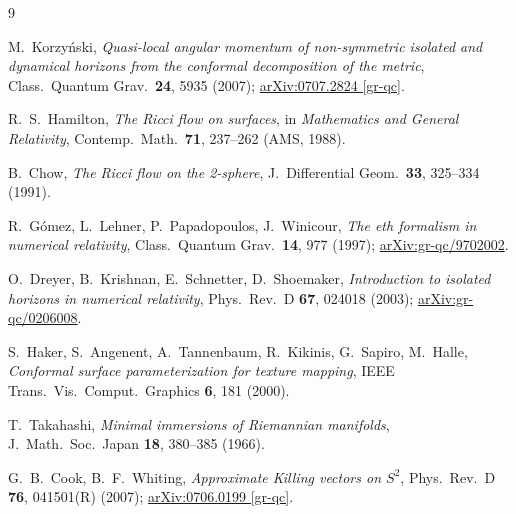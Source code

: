 \documentclass[11pt]{article}
\begin{document}
\begin{thebibliography}{9}

M.~Korzy\'nski,
\emph{Quasi-local angular momentum of non-symmetric isolated and dynamical
horizons from the conformal decomposition of the metric},
Class.\ Quantum Grav.\ \textbf{24}, 5935 (2007);
\href{https://arxiv.org/abs/0707.2824}{arXiv:0707.2824 [gr-qc]}.

R.~S.~Hamilton,
\emph{The Ricci flow on surfaces},
in \emph{Mathematics and General Relativity}, Contemp.\ Math.\ \textbf{71},
237--262 (AMS, 1988).

B.~Chow,
\emph{The Ricci flow on the 2-sphere},
J.\ Differential Geom.\ \textbf{33}, 325--334 (1991).

R.~G\'omez, L.~Lehner, P.~Papadopoulos, J.~Winicour,
\emph{The eth formalism in numerical relativity},
Class.\ Quantum Grav.\ \textbf{14}, 977 (1997);
\href{https://arxiv.org/abs/gr-qc/9702002}{arXiv:gr-qc/9702002}.

O.~Dreyer, B.~Krishnan, E.~Schnetter, D.~Shoemaker,
\emph{Introduction to isolated horizons in numerical relativity},
Phys.\ Rev.\ D \textbf{67}, 024018 (2003);
\href{https://arxiv.org/abs/gr-qc/0206008}{arXiv:gr-qc/0206008}.

S.~Haker, S.~Angenent, A.~Tannenbaum, R.~Kikinis, G.~Sapiro, M.~Halle,
\emph{Conformal surface parameterization for texture mapping},
IEEE Trans.\ Vis.\ Comput.\ Graphics \textbf{6}, 181 (2000).

T.~Takahashi,
\emph{Minimal immersions of Riemannian manifolds},
J.\ Math.\ Soc.\ Japan \textbf{18}, 380--385 (1966).

G.~B.~Cook, B.~F.~Whiting,
\emph{Approximate Killing vectors on $S^2$},
Phys.\ Rev.\ D \textbf{76}, 041501(R) (2007);
\href{https://arxiv.org/abs/0706.0199}{arXiv:0706.0199 [gr-qc]}.

\end{thebibliography}
\end{document}
